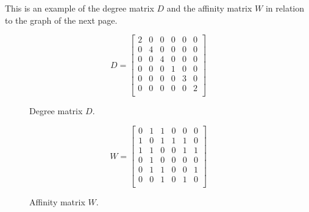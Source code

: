 This is an example of the degree matrix $D$ and the affinity matrix $W$ in relation to the graph of the next page.
\begin{figure}[H]
	\begin{minipage}[t]{0.49\linewidth} 
		\centering
		$$ D = \begin{bmatrix}
		2 & 0 & 0 & 0 & 0 & 0 \\
		0 & 4 & 0 & 0 & 0 & 0 \\
		0 & 0 & 4 & 0 & 0 & 0 \\
		0 & 0 & 0 & 1 & 0 & 0 \\
		0 & 0 & 0 & 0 & 3 & 0 \\
		0 & 0 & 0 & 0 & 0 & 2 \\
		\end{bmatrix}$$
		\caption{Degree matrix $D$.}
	\end{minipage}        
	\hspace{1cm}
	\begin{minipage}[t]{0.49\linewidth} 
		\centering
		$$ W = \begin{bmatrix}
		0 & 1 & 1 & 0 & 0 & 0 \\
		1 & 0 & 1 & 1 & 1 & 0 \\
		1 & 1 & 0 & 0 & 1 & 1 \\
		0 & 1 & 0 & 0 & 0 & 0 \\
		0 & 1 & 1 & 0 & 0 & 1 \\
		0 & 0 & 1 & 0 & 1 & 0 \\
		\end{bmatrix}$$
		\caption{Affinity matrix $W$.}
	\end{minipage}
\end{figure}



